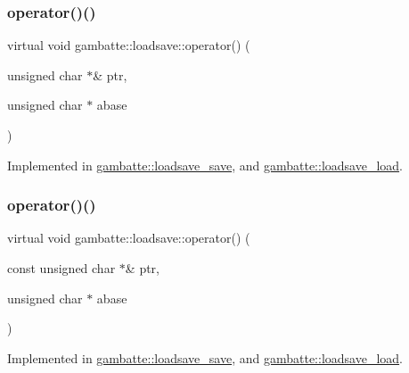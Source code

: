 \subsubsection{\texorpdfstring{operator()()}{operator()()}\hspace{0.1cm}{\footnotesize\ttfamily [18/19]}}
{\footnotesize\ttfamily virtual void gambatte\+::loadsave\+::operator() (\begin{DoxyParamCaption}\item[{unsigned char $\ast$\&}]{ptr,  }\item[{unsigned char $\ast$}]{abase }\end{DoxyParamCaption})\hspace{0.3cm}{\ttfamily [pure virtual]}}



Implemented in \hyperlink{classgambatte_1_1loadsave__save_a5b38424b1f911e556303de3521424b1e}{gambatte\+::loadsave\+\_\+save}, and \hyperlink{classgambatte_1_1loadsave__load_aa2d8402dc6fdececfd223520fc9cf0d8}{gambatte\+::loadsave\+\_\+load}.

\mbox{\label{classgambatte_1_1loadsave_a57518c27d7844ae48faea91fc04a680a}} 
\subsubsection{\texorpdfstring{operator()()}{operator()()}\hspace{0.1cm}{\footnotesize\ttfamily [19/19]}}
{\footnotesize\ttfamily virtual void gambatte\+::loadsave\+::operator() (\begin{DoxyParamCaption}\item[{const unsigned char $\ast$\&}]{ptr,  }\item[{unsigned char $\ast$}]{abase }\end{DoxyParamCaption})\hspace{0.3cm}{\ttfamily [pure virtual]}}



Implemented in \hyperlink{classgambatte_1_1loadsave__save_ab01cad527821d3a04eea9fae06d1e4bf}{gambatte\+::loadsave\+\_\+save}, and \hyperlink{classgambatte_1_1loadsave__load_a58313e7e62236560888348cf8e779cb0}{gambatte\+::loadsave\+\_\+load}.

\mbox{\label{classgambatte_1_1loadsave_a0a05b67eadfbb26f654f3d5ec287c652}} 
